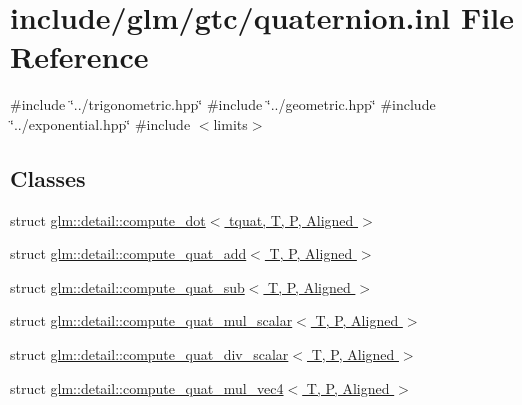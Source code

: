 \hypertarget{gtc_2quaternion_8inl}{}\section{include/glm/gtc/quaternion.inl File Reference}
\label{gtc_2quaternion_8inl}
{\ttfamily \#include \char`\"{}../trigonometric.\+hpp\char`\"{}}\newline
{\ttfamily \#include \char`\"{}../geometric.\+hpp\char`\"{}}\newline
{\ttfamily \#include \char`\"{}../exponential.\+hpp\char`\"{}}\newline
{\ttfamily \#include $<$limits$>$}\newline
\subsection*{Classes}
\begin{DoxyCompactItemize}
\item 
struct \hyperlink{structglm_1_1detail_1_1compute__dot_3_01tquat_00_01T_00_01P_00_01Aligned_01_4}{glm\+::detail\+::compute\+\_\+dot$<$ tquat, T, P, Aligned $>$}
\item 
struct \hyperlink{structglm_1_1detail_1_1compute__quat__add}{glm\+::detail\+::compute\+\_\+quat\+\_\+add$<$ T, P, Aligned $>$}
\item 
struct \hyperlink{structglm_1_1detail_1_1compute__quat__sub}{glm\+::detail\+::compute\+\_\+quat\+\_\+sub$<$ T, P, Aligned $>$}
\item 
struct \hyperlink{structglm_1_1detail_1_1compute__quat__mul__scalar}{glm\+::detail\+::compute\+\_\+quat\+\_\+mul\+\_\+scalar$<$ T, P, Aligned $>$}
\item 
struct \hyperlink{structglm_1_1detail_1_1compute__quat__div__scalar}{glm\+::detail\+::compute\+\_\+quat\+\_\+div\+\_\+scalar$<$ T, P, Aligned $>$}
\item 
struct \hyperlink{structglm_1_1detail_1_1compute__quat__mul__vec4}{glm\+::detail\+::compute\+\_\+quat\+\_\+mul\+\_\+vec4$<$ T, P, Aligned $>$}
\end{DoxyCompactItemize}
